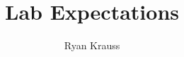 \documentclass[t,12pt,aspectratio=169]{beamer}
\author{Ryan Krauss}
\institute{EGR 345}
\begin{document}
\title[Lab Expectations]{Lab Expectations
  \label{lecture-top}%
  \\ %
  \label{egr-345}}
\author[Dr. Ryan Krauss]{}
\date{}
\maketitle


\end{document}
